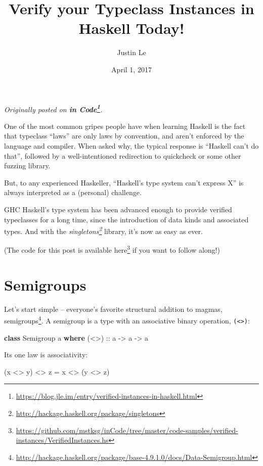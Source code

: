 \documentclass[]{article}
\title{Verify your Typeclass Instances in Haskell Today!}
\author{Justin Le}
\date{April 1, 2017}
\newenvironment{Shaded}{}{}
\newcommand{\DataTypeTok}[1]{\textcolor[rgb]{0.56,0.13,0.00}{#1}}
\newcommand{\KeywordTok}[1]{\textcolor[rgb]{0.00,0.44,0.13}{\textbf{#1}}}
\newcommand{\NormalTok}[1]{#1}
\newcommand{\OperatorTok}[1]{\textcolor[rgb]{0.40,0.40,0.40}{#1}}
\newcommand{\OtherTok}[1]{\textcolor[rgb]{0.00,0.44,0.13}{#1}}
\renewcommand{\href}[2]{#2\footnote{\url{#1}}}
\begin{document}
\maketitle

\emph{Originally posted on
\textbf{\href{https://blog.jle.im/entry/verified-instances-in-haskell.html}{in
Code}}.}

One of the most common gripes people have when learning Haskell is the fact that
typeclass ``laws'' are only laws by convention, and aren't enforced by the
language and compiler. When asked why, the typical response is ``Haskell can't
do that'', followed by a well-intentioned redirection to quickcheck or some
other fuzzing library.

But, to any experienced Haskeller, ``Haskell's type system can't express X'' is
always interpreted as a (personal) challenge.

GHC Haskell's type system has been advanced enough to provide verified
typeclasses for a long time, since the introduction of data kinds and associated
types. And with the
\emph{\href{http://hackage.haskell.org/package/singletons}{singletons}} library,
it's now as easy as ever.

(The code for this post is available
\href{https://github.com/mstksg/inCode/tree/master/code-samples/verified-instances/VerifiedInstances.hs}{here}
if you want to follow along!)

\hypertarget{semigroups}{%
\section{Semigroups}\label{semigroups}}

Let's start simple -- everyone's favorite structural addition to magmas,
\href{http://hackage.haskell.org/package/base-4.9.1.0/docs/Data-Semigroup.html}{semigroups}.
A semigroup is a type with an associative binary operation,
\texttt{(\textless{}\textgreater{})}:

\begin{Shaded}
\begin{Highlighting}[]
\KeywordTok{class} \DataTypeTok{Semigroup}\NormalTok{ a }\KeywordTok{where}
\OtherTok{    (<>) ::}\NormalTok{ a }\OtherTok{{-}>}\NormalTok{ a }\OtherTok{{-}>}\NormalTok{ a}
\end{Highlighting}
\end{Shaded}

Its one law is associativity:

\begin{Shaded}
\begin{Highlighting}[]
\NormalTok{(x }\OperatorTok{<>}\NormalTok{ y) }\OperatorTok{<>}\NormalTok{ z }\OtherTok{=}\NormalTok{ x }\OperatorTok{<>}\NormalTok{ (y }\OperatorTok{<>}\NormalTok{ z)}
\end{Highlighting}
\end{Shaded}
\end{document}
